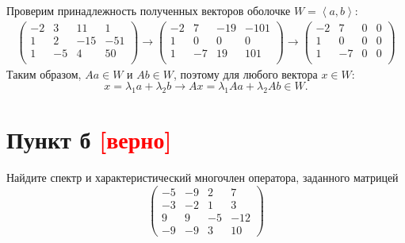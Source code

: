 \documentclass[12pt]{article}
\begin{document}
    Проверим принадлежность полученных векторов оболочке $W = \left < a, b \right >$:
    \begin{gather*}
        \begin{pmatrix}
            -2 & 3  & 11  & 1   \\
            1  & 2  & -15 & -51 \\
            1  & -5 & 4   & 50  \\
        \end{pmatrix}
        \rightarrow
        \begin{pmatrix}
            -2 & 7  & -19 & -101 \\
            1  & 0  & 0   & 0    \\
            1  & -7 & 19  & 101  \\
        \end{pmatrix}
        \rightarrow
        \begin{pmatrix}
            -2 & 7  & 0 & 0 \\
            1  & 0  & 0 & 0 \\
            1  & -7 & 0 & 0 \\
        \end{pmatrix}
    \end{gather*}
    Таким образом, $Aa \in W$ и $Ab \in W$, поэтому для любого вектора $x \in W$:
    \[
        x = \lambda_1 a + \lambda_2 b
        \rightarrow
        A x = \lambda_1 Aa + \lambda_2 Ab \in W.
    \]

    \section*{Пункт б \textcolor{red}{[верно]}}
    Найдите спектр и характеристический многочлен оператора, заданного матрицей
    \[
        \begin{pmatrix}
            -5 & -9 & 2  & 7   \\
            -3 & -2 & 1  & 3   \\
            9  & 9  & -5 & -12 \\
            -9 & -9 & 3  & 10
        \end{pmatrix}
    \]
\end{document}
